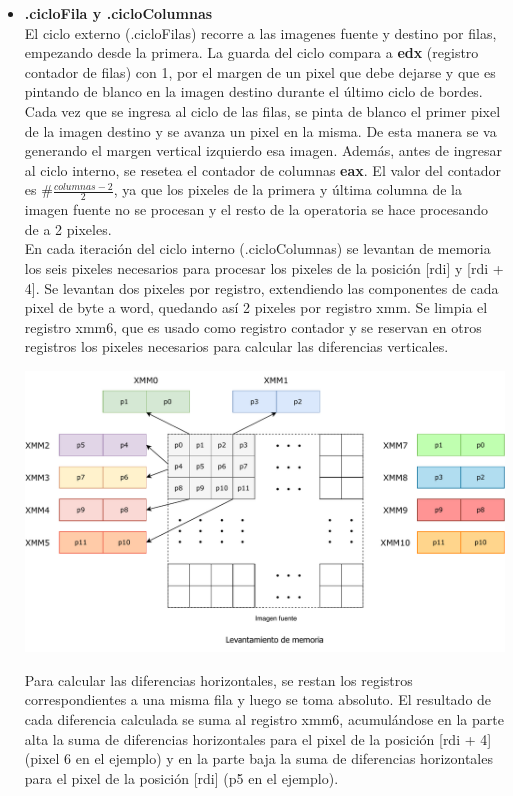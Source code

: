 \documentclass[a4paper]{article}
\begin{document}
\begin{itemize}
	\item \textbf{.cicloFila y .cicloColumnas}\\
	El ciclo externo (.cicloFilas) recorre a las imagenes fuente y destino por filas, empezando desde la primera. La guarda del ciclo compara a \textbf{edx} (registro contador de filas) con 1, por el margen de un pixel que debe dejarse y que es pintando de blanco en la imagen destino durante el último ciclo de bordes. Cada vez que se ingresa al ciclo de las filas, se pinta de blanco el primer pixel de la imagen destino y se avanza un pixel en la misma. De esta manera se va generando el margen vertical izquierdo esa imagen. Además, antes de ingresar al ciclo interno, se resetea el contador de columnas \textbf{eax}. El valor del contador es $\#\frac{columnas-2}{2}$, ya que los pixeles de la primera y última columna de la imagen fuente no se procesan y 
	el resto de la operatoria se hace procesando de a 2 pixeles.\\
	En cada iteración del ciclo interno (.cicloColumnas) se levantan de memoria los seis pixeles necesarios para procesar los pixeles de la posición [rdi] y [rdi + 4]. Se levantan dos pixeles por registro, extendiendo las componentes de cada pixel de byte a word, quedando así 2 pixeles por registro xmm. Se limpia el registro xmm6, que es usado como registro contador y se reservan en otros registros los pixeles necesarios para calcular las diferencias verticales.
	\begin{center}
		\includegraphics[scale=0.6]{img/LevColorBordes.pdf}
	\end{center}
	
	Para calcular las diferencias horizontales, se restan los registros correspondientes a una misma fila y luego se toma absoluto. El resultado de cada diferencia calculada se suma al registro xmm6, acumulándose en la parte alta la suma de diferencias horizontales para el pixel de la posición [rdi + 4] (pixel 6 en el ejemplo) y en la parte baja la suma de diferencias horizontales para el pixel de la posición [rdi] (p5 en el ejemplo).
	

\end{itemize}
\end{document}
